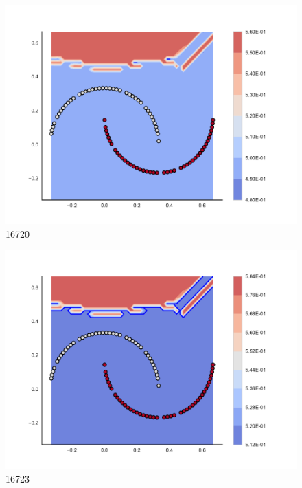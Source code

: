 \begin{subfigure}[b]{0.09\textwidth}
    \includegraphics[clip, trim=2.35cm 1.75cm 4.5cm 0cm,width=\textwidth]{img/convergence/16720.pdf}
    \caption{16720}
    \label{fig:convergence_16720}
\end{subfigure}
%
\begin{subfigure}[b]{0.09\textwidth}
    \includegraphics[clip, trim=2.35cm 1.75cm 4.5cm 0cm,width=\textwidth]{img/convergence/16723.pdf}
    \caption{16723}
    \label{fig:convergence_16723}
\end{subfigure}
%
